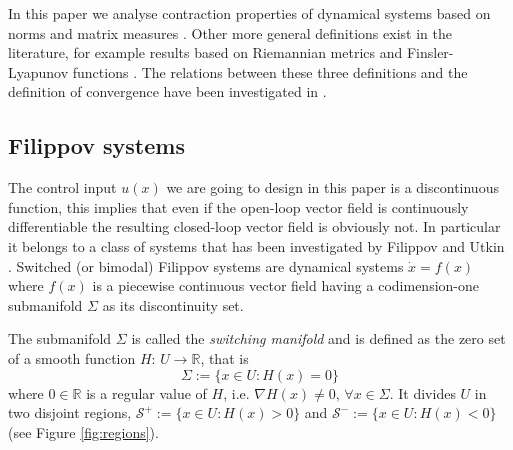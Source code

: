 \documentclass[letterpaper, 10 pt, conference]{ieeeconf}
\begin{document}
In this paper we analyse contraction properties of dynamical systems based on norms and matrix measures \cite{russo2010global}. Other more general definitions exist in the literature, for example results based on Riemannian metrics \cite{lohmiller1998contraction} and Finsler-Lyapunov functions \cite{forni2014differential}. The relations between these three definitions and the definition of convergence \cite{pavlov2004convergent} have been investigated in \cite{forni2014differential}.

\subsection{Filippov systems}
The control input $u(x)$ we are going to design in this paper is a discontinuous function, this implies that even if the open-loop vector field is continuously differentiable the resulting closed-loop vector field is obviously not. In particular it belongs to a class of systems that has been investigated by Filippov \cite{filippov1988differential} and Utkin \cite{utkin2013sliding}. Switched (or bimodal) Filippov systems are dynamical systems $\dot{x}=f(x)$ where $f(x)$ is a piecewise continuous vector field having a codimension-one submanifold $\Sigma$ as its discontinuity set.
 
The submanifold $\Sigma$ is called the \emph{switching manifold} and is defined as the zero set of a smooth function $H:\,U\rightarrow\mathbb{R}$, that is
\begin{equation}
\label{eq:switching_manifold}
\Sigma:=\{x\in U : H(x)=0\} 
\end{equation}
where $0\in\mathbb{R}$ is a regular value of $H$, i.e. $\nabla H(x)\neq 0,\, \forall x\in\Sigma$. It divides $U$ in two disjoint regions, $\mathcal{S}^+:=\{x\in U : H(x)>0\}$ and ${\mathcal{S}^-:=\{x\in U : H(x)<0\}}$ (see Figure \ref{fig:regions}).
\end{document}
